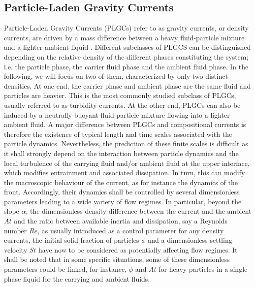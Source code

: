 \documentclass[twocolumn]{article}
\begin{document}
\subsection{Particle-Laden Gravity Currents}

Particle-Laden Gravity Currents (PLGCs) refer to as gravity currents, or density currents, are driven by a mass difference between a heavy fluid-particle mixture and a lighter ambient liquid \citep{Hopfinger1983,Middleton1993,Kneller2000,Meiburg2010,wells2021}. Different subclasses of PLGCS can be distinguished depending on the relative density of the different phases constituting the system; i.e. the particle phase, the carrier fluid phase and the ambient fluid phase. In the following, we will focus on two of them, characterized by only two distinct densities. At one end, the carrier phase and ambient phase are the same fluid and particles are heavier. This is the most commonly studied subclass of PLGCs, usually referred to as turbidity currents. At the other end, PLGCs can also be induced by a neutrally-buoyant fluid-particle mixture flowing into a lighter ambient fluid. A major difference between PLGCs and compositional currents is therefore the existence of typical length and time scales associated with the particle dynamics.
Nevertheless, the prediction of these finite scales is difficult as it shall strongly depend on the interaction between particle dynamics and the local turbulence of the carrying fluid and/or ambient fluid at the upper interface, which modifies entrainment and associated dissipation. In turn, this can modify the macroscopic behaviour of the current, as for instance the dynamics of the front. Accordingly, their dynamics shall be controlled by several dimensionless parameters leading to a wide variety of flow regimes. In particular, beyond the slope $\alpha$, the dimensionless density difference between the current and the ambient $At$ and the ratio between available inertia and dissipation, say a Reynolds number $Re$, as usually introduced as a control parameter for any density currents, the initial solid fraction of particles $\phi$ and a dimensionless settling velocity $St$ have now to be considered as potentially affecting flow regimes. It shall be noted that in some specific situations, some of these dimensionless parameters could be linked, for instance, $\phi$ and $At$ for heavy particles in a single-phase liquid for the carrying and ambient fluids.
\end{document}
